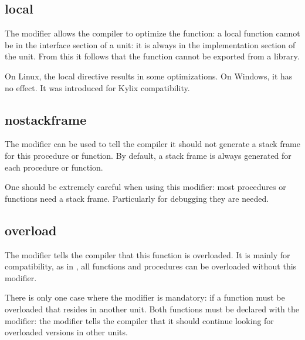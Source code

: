 \subsection{local}
\label{se:local}
The  modifier allows the compiler to optimize the function: a local
function cannot be in the interface section of a unit: it is always in the
implementation section of the unit. From this it follows that the function
cannot be exported from a library. 

On Linux, the local directive results in some optimizations. On Windows, it
has no effect. It was introduced for Kylix compatibility.

\subsection{nostackframe}
\label{se:nostackframe}
The  modifier can be used to tell the compiler it should
not generate a stack frame for this procedure or function. By default, a
stack frame is always generated for each procedure or function.

One should be extremely careful when using this modifier: most procedures or
functions need a stack frame. Particularly for debugging they are needed.

\subsection{overload}
\label{se:overload}
The  modifier tells the compiler that this function is
overloaded. It is mainly for \delphi compatibility, as in \fpc, all
functions and procedures can be overloaded without this modifier.

There is only one case where the  modifier is mandatory:
if a function must be overloaded that resides in another unit. Both
functions must be declared with the  modifier: the
 modifier tells the compiler that it should continue 
looking for overloaded versions in other units.

